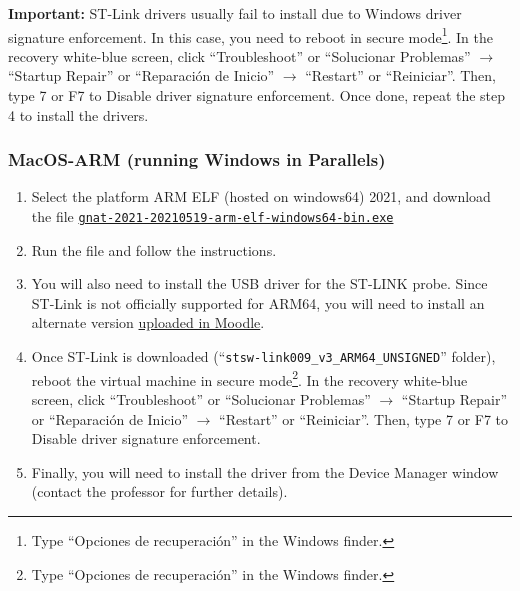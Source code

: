 \textbf{\textcolor{mRedBrown}{Important:}} ST-Link drivers usually fail to install due to Windows driver signature enforcement. In this case, you need to reboot in secure mode\footnote{Type ``Opciones de recuperación'' in the Windows finder.}. In the recovery white-blue screen, click ``Troubleshoot'' or ``Solucionar Problemas'' $\rightarrow$ ``Startup Repair'' or ``Reparación de Inicio'' $\rightarrow$ ``Restart'' or ``Reiniciar''. Then, type 7 or F7 to Disable driver signature enforcement. Once done, repeat the step 4 to install the drivers. %
%
%

\subsubsection*{MacOS-ARM (running Windows in Parallels\texttrademark{})}

\begin{enumerate}
	\item Select the platform ARM ELF (hosted on windows64) 2021, and download the file
	\href{https://community.download.adacore.com/v1/3af961d8c675e36d87934450bc6356a84a0d753b?filename=gnat-2021-20210519-arm-elf-windows64-bin.exe&rand=444}{\nolinkurl{gnat-2021-20210519-arm-elf-windows64-bin.exe}}
	\item Run the file and follow the instructions.
	\item You will also need to install the USB driver for the ST-LINK probe. Since ST-Link is not officially supported for ARM64, you will need to install an alternate version \href{https://moodle.upm.es/titulaciones/oficiales/mod/resource/view.php?id=460888}{uploaded in Moodle}.

	\item  Once ST-Link is downloaded (``\texttt{stsw-link009\_v3\_ARM64\_UNSIGNED}'' folder), reboot the virtual  machine in secure mode\footnote{Type ``Opciones de recuperación'' in the Windows finder.}. In the recovery white-blue screen, click ``Troubleshoot'' or ``Solucionar Problemas'' $\rightarrow$ ``Startup Repair'' or ``Reparación de Inicio'' $\rightarrow$ ``Restart'' or ``Reiniciar''. Then, type 7 or F7 to Disable driver signature enforcement.
	
	\item Finally, you will need to install the driver from the Device Manager window (contact the professor for further details).
\end{enumerate}

